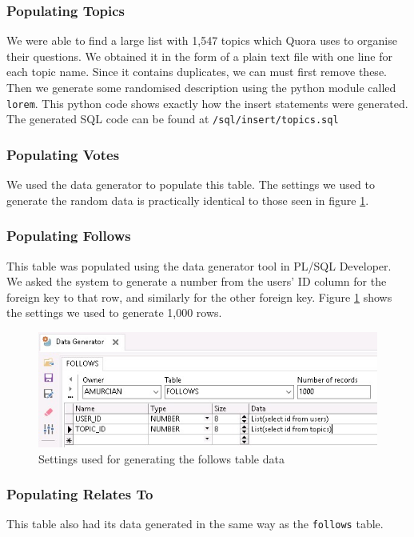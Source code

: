 \subsubsection{Populating Topics}

We were able to find a large list with 1,547 topics which Quora uses to organise their questions. We obtained it in the form of a plain text file with one line for each topic name. Since it contains duplicates, we can must first remove these. Then we generate some randomised description using the python module called \verb`lorem`. This python code shows exactly how the insert statements were generated. The generated SQL code can be found at \verb`/sql/insert/topics.sql`


\subsubsection{Populating Votes}

We used the data generator to populate this table. The settings we used to generate the random data is practically identical to those seen in figure \ref{follows-generator}.

\subsubsection{Populating Follows}

This table was populated using the data generator tool in PL/SQL Developer. We asked the system to generate a number from the users' ID column for the foreign key to that row, and similarly for the other foreign key. Figure \ref{follows-generator} shows the settings we used to generate 1,000 rows.

\begin{figure}[htbp]
	\centering
	\includegraphics[width=\linewidth]{images/follows_generator.jpeg}
	\caption{Settings used for generating the follows table data}
	\label{follows-generator}
\end{figure}

\subsubsection{Populating Relates To}

This table also had its data generated in the same way as the \verb`follows` table.